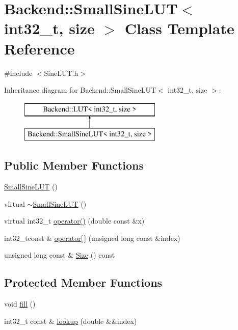 \hypertarget{classBackend_1_1SmallSineLUT_3_01int32__t_00_01size_01_4}{\section{Backend\+:\+:Small\+Sine\+L\+U\+T$<$ int32\+\_\+t, size $>$ Class Template Reference}
\label{classBackend_1_1SmallSineLUT_3_01int32__t_00_01size_01_4}
}


{\ttfamily \#include $<$Sine\+L\+U\+T.\+h$>$}

Inheritance diagram for Backend\+:\+:Small\+Sine\+L\+U\+T$<$ int32\+\_\+t, size $>$\+:\begin{figure}[H]
\begin{center}
\leavevmode
\includegraphics[height=2.000000cm]{classBackend_1_1SmallSineLUT_3_01int32__t_00_01size_01_4}
\end{center}
\end{figure}
\subsection*{Public Member Functions}
\begin{DoxyCompactItemize}
\item 
\hyperlink{classBackend_1_1SmallSineLUT_3_01int32__t_00_01size_01_4_a05f2fcd7c8a0430dc0137e67d385dc1b}{Small\+Sine\+L\+U\+T} ()
\item 
virtual \hyperlink{classBackend_1_1SmallSineLUT_3_01int32__t_00_01size_01_4_a3db4fc45b900c846711e0cbd828dbbf4}{$\sim$\+Small\+Sine\+L\+U\+T} ()
\item 
virtual int32\+\_\+t \hyperlink{classBackend_1_1SmallSineLUT_3_01int32__t_00_01size_01_4_a7eff39a75385950b722ed2ba7140d4e4}{operator()} (double const \&x)
\item 
int32\+\_\+tconst \& \hyperlink{classBackend_1_1LUT_a9a7c75f36c72778098a091db3269c29c}{operator\mbox{[}$\,$\mbox{]}} (unsigned long const \&index)
\item 
unsigned long const \& \hyperlink{classBackend_1_1LUT_a3ab84f04569e89cd6046da599c6edbae}{Size} () const
\end{DoxyCompactItemize}
\subsection*{Protected Member Functions}
\begin{DoxyCompactItemize}
\item 
void \hyperlink{classBackend_1_1SmallSineLUT_3_01int32__t_00_01size_01_4_a0fad3b2c0904d1c2a65c850431f1ac3f}{fill} ()
\item 
int32\+\_\+t const \& \hyperlink{classBackend_1_1SmallSineLUT_3_01int32__t_00_01size_01_4_ab58e1db04772d8fad7b5d0f4936454bd}{lookup} (double \&\&index)
\end{DoxyCompactItemize}
